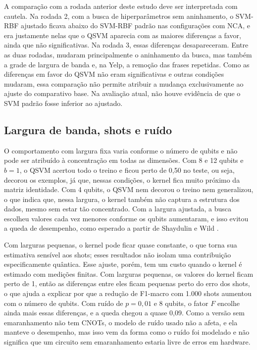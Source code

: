 \documentclass[conference]{IEEEtran}
\newcommand{\svm}{\mbox{SVM-RBF}}
\begin{document}
A comparação com a rodada anterior deste estudo deve ser interpretada com cautela. Na rodada 2, com a busca de hiperparâmetros sem aninhamento, o \svm{} ajustado ficava abaixo do \svm{} padrão nas configurações com NCA, e era justamente nelas que o QSVM aparecia com as maiores diferenças a favor, ainda que não significativas. Na rodada 3, essas diferenças desapareceram. Entre as duas rodadas, mudaram principalmente o aninhamento da busca, mas também a grade de largura de banda e, na Yelp, a remoção das frases repetidas. Como as diferenças em favor do QSVM não eram significativas e outras condições mudaram, essa comparação não permite atribuir a mudança exclusivamente ao ajuste do comparativo base. Na avaliação atual, não houve evidência de que o SVM padrão fosse inferior ao ajustado.

\subsection{Largura de banda, shots e ruído}
O comportamento com largura fixa varia conforme o número de qubits e não pode ser atribuído à concentração em todas as dimensões. Com 8 e 12 qubits e $b = 1$, o QSVM acertou todo o treino e ficou perto de 0,50 no teste, ou seja, decorou os exemplos, já que, nessas condições, o kernel fica muito próximo da matriz identidade. Com 4 qubits, o QSVM nem decorou o treino nem generalizou, o que indica que, nessa largura, o kernel também não captura a estrutura dos dados, mesmo sem estar tão concentrado. Com a largura ajustada, a busca escolheu valores cada vez menores conforme os qubits aumentaram, e isso evitou a queda de desempenho, como esperado a partir de Shaydulin e Wild \cite{shaydulin2021}.

Com larguras pequenas, o kernel pode ficar quase constante, o que torna sua estimativa sensível aos shots; esses resultados não isolam uma contribuição especificamente quântica. Esse ajuste, porém, tem um custo quando o kernel é estimado com medições finitas. Com larguras pequenas, os valores do kernel ficam perto de 1, então as diferenças entre eles ficam pequenas perto do erro dos shots, o que ajuda a explicar por que a redução de F1-macro com 1.000 shots aumentou com o número de qubits. Com ruído de $p = 0{,}01$ e 8 qubits, o fator $F$ encolhe ainda mais essas diferenças, e a queda chegou a quase 0,09. Como a versão sem emaranhamento não tem CNOTs, o modelo de ruído usado não a afeta, e ela manteve o desempenho, mas isso vem da forma como o ruído foi modelado e não significa que um circuito sem emaranhamento estaria livre de erros em hardware.
\end{document}
